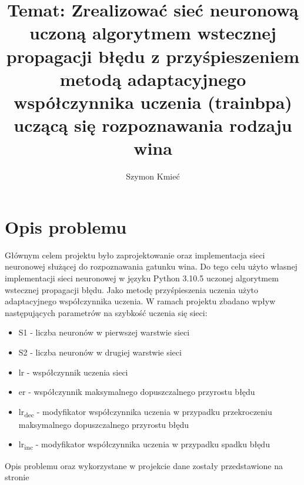 \documentclass[12pt,twoside]{article}
\title{Temat: Zrealizować sieć neuronową uczoną algorytmem wstecznej propagacji błędu z przyśpieszeniem metodą adaptacyjnego współczynnika uczenia (trainbpa)
uczącą się rozpoznawania rodzaju wina}
\author{Szymon Kmieć}
\begin{document}
\maketitle

\blankpage

\tableofcontents

\clearpage
\blankpage


\section{Opis problemu}
Głównym celem projektu było zaprojektowanie oraz implementacja sieci neuronowej służącej do rozpoznawania gatunku wina. Do tego celu użyto własnej implementacji sieci neuronowej w języku Python 3.10.5 uczonej algorytmem wstecznej propagacji błędu. Jako metodę przyśpieszenia uczenia użyto adaptacyjnego współczynnika uczenia. W ramach projektu zbadano wpływ następujących parametrów na szybkość uczenia się sieci: 

\begin{itemize}
\item S1 - liczba neuronów w pierwszej warstwie sieci
\item S2 - liczba neuronów w drugiej warstwie sieci
\item lr - współczynnik uczenia sieci
\item er - współczynnik maksymalnego dopuszczalnego przyrostu błędu
\item lr\textsubscript{dec} - modyfikator współczynnika uczenia w przypadku przekroczeniu maksymalnego dopuszczalnego przyrostu błędu
\item lr\textsubscript{inc} - modyfikator współczynnika uczenia w przypadku spadku błędu
\end{itemize}

Opis problemu oraz wykorzystane w projekcie dane zostały przedstawione na stronie \cite{dane}

\clearpage
\end{document}
